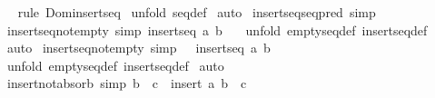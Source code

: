 \begin{isabellebody}
\isamarkupfalse%
\ {}\isanewline
{}\isamarkupfalse%
\ {\isacharparenleft}rule\ Dom{\isacharunderscore}insertseq{\isacharparenright}\isanewline
{}\isamarkupfalse%
\ {\isacharparenleft}unfold\ seq{\isacharunderscore}def{\isacharparenright}\isanewline
{}\isamarkupfalse%
\ auto\isanewline
{}\isamarkupfalse%
%
\endisatagproof
{\isafoldproof}%
%
\isadelimproof
\isanewline
%
\endisadelimproof
{}\isamarkupfalse%
\ insertseq{\isacharunderscore}seq{\isacharunderscore}pred\ {\isacharbrackleft}simp{\isacharbrackright}\isanewline
\isanewline
{}\isamarkupfalse%
\ insertseq{\isacharunderscore}not{\isacharunderscore}empty\ {\isacharbrackleft}simp{\isacharbrackright}{\isacharcolon}\ {\isachardoublequoteopen}insertseq\ a\ b\ {\isachartilde}{\isacharequal}\ {\isacharpercent}{\isacharless}{\isacharpercent}{\isachargreater}{\isachardoublequoteclose}\isanewline
%
\isadelimproof
%
\endisadelimproof
%
\isatagproof
{}\isamarkupfalse%
\ {\isacharparenleft}unfold\ emptyseq{\isacharunderscore}def\ insertseq{\isacharunderscore}def{\isacharparenright}\isanewline
{}\isamarkupfalse%
\ auto\isanewline
{}\isamarkupfalse%
%
\endisatagproof
{\isafoldproof}%
%
\isadelimproof
\isanewline
%
\endisadelimproof
\isanewline
{}\isamarkupfalse%
\ insertseq{\isacharunderscore}not{\isacharunderscore}empty{}\ {\isacharbrackleft}simp{\isacharbrackright}{\isacharcolon}\ {\isachardoublequoteopen}{\isacharpercent}{\isacharless}{\isacharpercent}{\isachargreater}\ {\isachartilde}{\isacharequal}\ insertseq\ a\ b{\isachardoublequoteclose}\isanewline
%
\isadelimproof
%
\endisadelimproof
%
\isatagproof
{}\isamarkupfalse%
\ {\isacharparenleft}unfold\ emptyseq{\isacharunderscore}def\ insertseq{\isacharunderscore}def{\isacharparenright}\isanewline
{}\isamarkupfalse%
\ auto\isanewline
{}\isamarkupfalse%
%
\endisatagproof
{\isafoldproof}%
%
\isadelimproof
\isanewline
%
\endisadelimproof
\isanewline
\isanewline
\isanewline
\isanewline
{}\isamarkupfalse%
\ insert{\isacharunderscore}not{\isacharunderscore}absorb{}\ {\isacharbrackleft}simp{\isacharbrackright}{\isacharcolon}\ {\isachardoublequoteopen}{\isachartilde}{\isacharparenleft}b\ {\isacharless}{\isacharequal}\ c{\isacharparenright}\ {\isacharminus}{\isacharminus}{\isachargreater}\ insert\ a\ b\ {\isachartilde}{\isacharequal}\ c{\isachardoublequoteclose}\isanewline
%
\isadelimproof
%
\endisadelimproof

\end{isabellebody}
